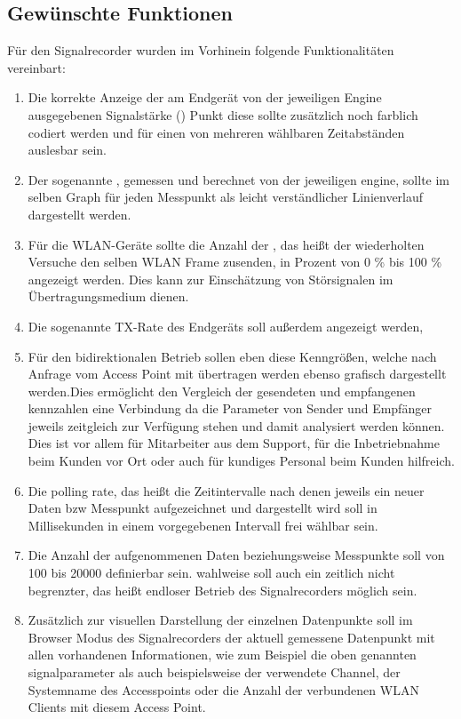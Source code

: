 \subsection{Gewünschte Funktionen}
Für den Signalrecorder wurden im Vorhinein folgende Funktionalitäten vereinbart: \\
\begin{enumerate}
        \item Die korrekte Anzeige der am Endgerät von der jeweiligen Engine ausgegebenen Signalstärke () Punkt diese sollte zusätzlich noch farblich codiert werden und für einen von mehreren wählbaren Zeitabständen auslesbar sein.
        \item Der sogenannte ,  gemessen und berechnet von der jeweiligen engine, sollte im selben Graph für jeden Messpunkt als leicht verständlicher Linienverlauf dargestellt werden.
        \item Für die WLAN-Geräte sollte die Anzahl der , das heißt der wiederholten Versuche den selben WLAN Frame zusenden, in Prozent von 0 \% bis 100 \% angezeigt werden. Dies kann zur Einschätzung von Störsignalen im Übertragungsmedium dienen.
        \item Die sogenannte TX-Rate des Endgeräts soll außerdem angezeigt werden,
        \item Für den bidirektionalen Betrieb sollen eben diese Kenngrößen, welche nach Anfrage vom Access Point mit übertragen werden  ebenso grafisch dargestellt werden.Dies ermöglicht den Vergleich der gesendeten und empfangenen kennzahlen eine Verbindung da die Parameter von Sender und Empfänger jeweils zeitgleich zur Verfügung stehen und damit analysiert werden können.  Dies ist vor allem für Mitarbeiter aus dem Support, für die Inbetriebnahme beim Kunden vor Ort oder auch für kundiges Personal beim Kunden hilfreich.
        \item Die polling rate, das heißt die Zeitintervalle nach denen jeweils ein neuer Daten bzw Messpunkt aufgezeichnet und dargestellt wird soll in Millisekunden in einem vorgegebenen Intervall frei wählbar sein.
        \item Die Anzahl der aufgenommenen Daten beziehungsweise Messpunkte soll von 100 bis 20000  definierbar sein. wahlweise soll auch ein zeitlich nicht begrenzter, das heißt endloser Betrieb des Signalrecorders möglich sein.
        \item Zusätzlich zur visuellen Darstellung der einzelnen Datenpunkte soll im Browser Modus des Signalrecorders der aktuell gemessene Datenpunkt mit allen vorhandenen Informationen, wie zum Beispiel die oben genannten signalparameter als auch beispielsweise der verwendete Channel, der Systemname des Accesspoints  oder die Anzahl der verbundenen WLAN Clients mit diesem Access Point.

\end{enumerate}
